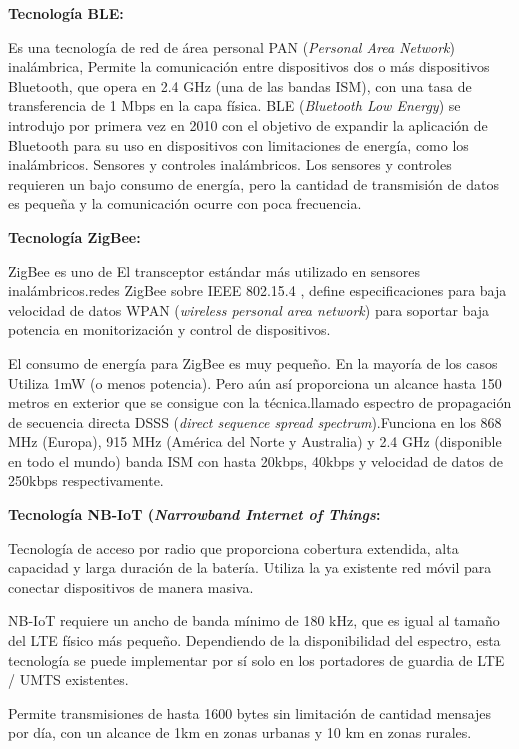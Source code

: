 \textbf{Tecnología BLE:}

Es una tecnología de red de área personal PAN (\textit{Personal Area Network}) inalámbrica, Permite la comunicación entre dispositivos dos o  más dispositivos Bluetooth, que opera en 2.4 GHz (una de las bandas ISM), con una tasa de transferencia de 1 Mbps en la capa física. BLE (\textit{Bluetooth Low Energy}) se introdujo por primera vez en 2010 con el objetivo de expandir la aplicación de Bluetooth para su uso en dispositivos con limitaciones de energía, como los inalámbricos. Sensores y controles inalámbricos. Los sensores y controles requieren un bajo consumo de energía, pero la cantidad de transmisión de datos es pequeña y la comunicación ocurre con poca frecuencia\citep{chang2014bluetooth}.


\textbf{Tecnología ZigBee:}

ZigBee es uno de El transceptor estándar más utilizado en sensores inalámbricos.redes ZigBee sobre IEEE 802.15.4 , define especificaciones para baja velocidad de datos WPAN (\textit{wireless personal area network}) para soportar baja potencia en monitorización y control de dispositivos\citep{ramya2011study}.

El consumo de energía para ZigBee es muy pequeño. En la mayoría de los casos Utiliza 1mW (o menos potencia). Pero aún así proporciona un alcance hasta 150 metros en exterior que se consigue con la técnica.llamado espectro de propagación de secuencia directa DSSS (\textit{direct sequence spread spectrum}).Funciona en los 868 MHz (Europa), 915 MHz (América del Norte y Australia) y 2.4 GHz (disponible en todo el mundo) banda ISM con hasta 20kbps, 40kbps y velocidad de datos de 250kbps respectivamente\citep{ramya2011study}.

\textbf{Tecnología NB-IoT (\textit{Narrowband Internet of Things}:}

Tecnología de acceso por radio que proporciona cobertura extendida, alta capacidad y larga duración de la batería. Utiliza la ya existente red móvil para conectar dispositivos de manera masiva.

NB-IoT requiere un ancho de banda mínimo de 180 kHz, que es igual al tamaño del LTE físico más pequeño.
Dependiendo de la disponibilidad del espectro, esta tecnología se puede implementar por sí solo en los portadores de guardia de LTE / UMTS existentes\citep{adhikary2016performance}.

Permite transmisiones de hasta 1600 bytes sin limitación de cantidad mensajes por día, con un alcance de 1km en zonas urbanas y 10 km en zonas rurales\cite{MEKKI20191}.

